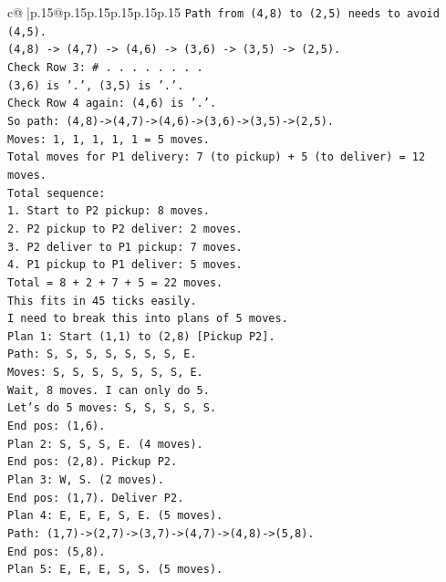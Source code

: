 \documentclass{article}
\begin{document}
{\begin{supertabular}{c@{$\;$}|p{.15\linewidth}@{}p{.15\linewidth}p{.15\linewidth}p{.15\linewidth}p{.15\linewidth}p{.15\linewidth}}
{{{\texttt{Path from (4,8) to (2,5) needs to avoid (4,5).} \\
\texttt{(4,8) {-}> (4,7) {-}> (4,6) {-}> (3,6) {-}> (3,5) {-}> (2,5).} \\
\texttt{Check Row 3: \# . . . . . . . .} \\
\texttt{(3,6) is '.', (3,5) is '.'.} \\
\texttt{Check Row 4 again: (4,6) is '.'.} \\
\texttt{So path: (4,8){-}>(4,7){-}>(4,6){-}>(3,6){-}>(3,5){-}>(2,5).} \\
\texttt{Moves: 1, 1, 1, 1, 1 = 5 moves.} \\
\texttt{Total moves for P1 delivery: 7 (to pickup) + 5 (to deliver) = 12 moves.} \\
\texttt{Total sequence:} \\
\texttt{1. Start to P2 pickup: 8 moves.} \\
\texttt{2. P2 pickup to P2 deliver: 2 moves.} \\
\texttt{3. P2 deliver to P1 pickup: 7 moves.} \\
\texttt{4. P1 pickup to P1 deliver: 5 moves.} \\
\texttt{Total = 8 + 2 + 7 + 5 = 22 moves.} \\
\texttt{This fits in 45 ticks easily.} \\
\texttt{I need to break this into plans of 5 moves.} \\
\texttt{Plan 1: Start (1,1) to (2,8) {[}Pickup P2{]}.} \\
\texttt{Path: S, S, S, S, S, S, S, E.} \\
\texttt{Moves: S, S, S, S, S, S, S, E.} \\
\texttt{Wait, 8 moves. I can only do 5.} \\
\texttt{Let's do 5 moves: S, S, S, S, S.} \\
\texttt{End pos: (1,6).} \\
\texttt{Plan 2: S, S, S, E. (4 moves).} \\
\texttt{End pos: (2,8). Pickup P2.} \\
\texttt{Plan 3: W, S. (2 moves).} \\
\texttt{End pos: (1,7). Deliver P2.} \\
\texttt{Plan 4: E, E, E, S, E. (5 moves).} \\
\texttt{Path: (1,7){-}>(2,7){-}>(3,7){-}>(4,7){-}>(4,8){-}>(5,8).} \\
\texttt{End pos: (5,8).} \\
\texttt{Plan 5: E, E, E, S, S. (5 moves).} \\
}}}
\end{supertabular}}
\end{document}
